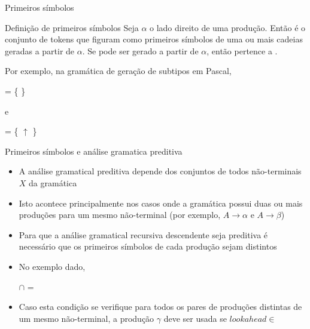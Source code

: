 \begin{frame}[fragile]{Primeiros símbolos}

    \begin{block}{Definição de primeiros símbolos}
        Seja $\alpha$ o lado direito de uma produção. Então  é o conjunto de tokens que figuram como primeiros símbolos de uma ou mais
        cadeias geradas a partir de $\alpha$. Se  pode ser gerado a partir de $\alpha$, então  pertence a .
    \end{block}

    \vspace{0.2in}
    Por exemplo, na gramática de geração de subtipos em Pascal,

    \begin{center} = \{  \}\end{center}

    e

    \begin{center} = \{ $\uparrow$ \}\end{center}

\end{frame}

\begin{frame}[fragile]{Primeiros símbolos e análise gramatica preditiva}

    \begin{itemize}
        \item A análise gramatical preditiva depende dos conjuntos  de todos não-terminais $X$ da gramática

        \item Isto acontece principalmente nos casos onde a gramática possui duas ou mais produções para um mesmo não-terminal (por exemplo, $A \to \alpha$ e
        $A\to \beta$)

        \item Para que a análise gramatical recursiva descendente seja preditiva é necessário que os primeiros símbolos de cada produção sejam distintos

        \item No exemplo dado,

        \begin{center}
         $\cap$  = \emptyset
        \end{center}

        \item Caso esta condição se verifique para todos os pares de produções distintas de um mesmo não-terminal, a produção $\gamma$ deve ser usada se
        $lookahead \in$ 
    \end{itemize}

\end{frame}

